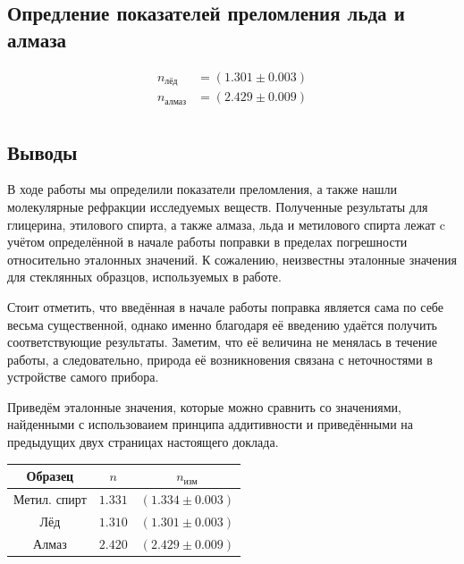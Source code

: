 \documentclass[12pt]{article}
\begin{document}
\subsection*{Опредление показателей преломления льда и алмаза}
\begin{align*}
	n_\text{лёд} &= \left(1.301 \pm 0.003\right) \\
	n_\text{алмаз} &= \left(2.429 \pm 0.009 \right) \\ 
\end{align*}

\subsection*{Выводы}
\par
	В ходе работы мы определили показатели преломления, а также нашли молекулярные рефракции исследуемых веществ. Полученные результаты для глицерина, этилового спирта, а также алмаза, льда и метилового спирта лежат c учётом определённой в начале работы поправки в пределах погрешности относительно эталонных значений. К сожалению, неизвестны эталонные значения для стеклянных образцов, используемых в работе.
\par
	Стоит отметить, что введённая в начале работы поправка является сама по себе весьма существенной, однако именно благодаря её введению удаётся получить соответствующие результаты. Заметим, что её величина не менялась в течение работы, а следовательно, природа её возникновения связана с неточностями в устройстве самого прибора.
\par
	Приведём эталонные значения, которые можно сравнить со значениями, найденными с использоваием принципа аддитивности и приведёнными  на предыдущих двух страницах настоящего доклада.
\begin{table}[h!]
	\centering
	\begin{tabular}{|c|c|c|}
	\hline
		Образец & $n$ & $n_\text{изм}$\\
	\hline
		Метил. спирт & $1.331$  & $\left(1.334 \pm 0.003 \right)$ \\
	\hline
		Лёд & $1.310$ &  $\left(1.301 \pm 0.003\right)$ \\
	\hline
		Алмаз & $2.420$ & $\left(2.429 \pm 0.009 \right)$ \\
	\hline
	\end{tabular}
\end{table} 
\end{document}
